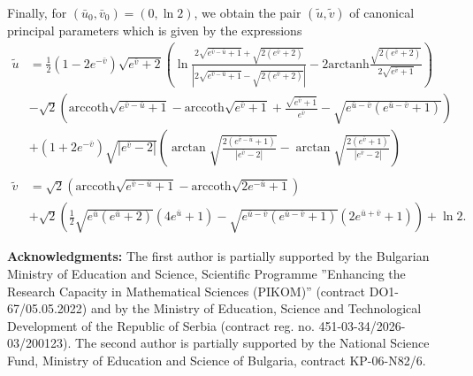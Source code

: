 \documentclass[12pt]{amsart}
\theoremstyle{definition}
\theoremstyle{remark}
\numberwithin{equation}{section}
\begin{document}
Finally, 
 for $(\bar u_0,\bar v_0)=(0, \ln 2)$, %
 we obtain the pair $(\tilde{u}, \tilde{v})$ of canonical principal parameters which is given by the expressions
\begin{equation*}
	\begin{split}
		\tilde{u} & = \frac{1}{2} (1-2e^{-\bar{v}})\sqrt{e^{\bar{v}}+2} \left( \ln \frac{ 2 \sqrt{e^{\bar{v} - \bar{u}}+1} + \sqrt{2(e^{\bar{v}}+2)} }{ | 2 \sqrt{e^{\bar{v} - \bar{u}}+1} - \sqrt{2(e^{\bar{v}}+2)} | } -2 \mathrm{arctanh}\frac{\sqrt{2(e^{\bar{v}}+2)} }{2\sqrt{e^{\bar{v}}+1}} \right) 
		\\ & - \sqrt{2} \left(  \mathrm{arccoth}\sqrt{e^{\bar{v} - \bar{u}}+1} -\mathrm{arccoth}\sqrt{e^{\bar{v} }+1}  + \frac{\sqrt{e^{\bar{v} }+1}}{e^{\bar{v} }} - \sqrt{ e^{\bar{u} - \bar{v}} (e^{\bar{u} - \bar{v}}+1) }  \right) 
		\\ & +  (1+2e^{-\bar{v}})\sqrt{|e^{\bar{v}}-2|} \left( \arctan\sqrt{ \frac{2(e^{\bar{v} - \bar{u}}+1) }{|e^{\bar{v}}-2| } } - \arctan\sqrt{ \frac{2(e^{\bar{v} }+1) }{|e^{\bar{v}}-2| } } \right) 
		\\	\\
		\tilde{v} & = \sqrt{2} \left( \mathrm{arccoth}\sqrt{e^{\bar{v} - \bar{u}}+1} -\mathrm{arccoth}\sqrt{2e^{-\bar{u} }+1}  \right) \\ & + \sqrt{2} \left( \frac{1}{2} \sqrt{e^{\bar{u}} (e^{\bar{u}}+2)  } (4e^{\bar{u}} + 1) - \sqrt{e^{\bar{u}-\bar{v}} (e^{\bar{u}-\bar{v}}+1)  } (2e^{\bar{u}+\bar{v}} + 1) \right) + \ln 2. 
\end{split}\end{equation*}








\vskip 6mm 
\textbf{Acknowledgments:}
The first author is partially supported by the Bulgarian Ministry of Education and  Science, Scientific Programme ''Enhancing the Research Capacity in Mathematical Sciences (PIKOM)''  (contract DO1-67/05.05.2022) and by the Ministry of Education, Science and Technological Development of the Republic of Serbia (contract reg. no. 451-03-34/2026-03/200123).
The second author is partially supported by the National Science Fund, Ministry of Education and Science of Bulgaria, contract KP-06-N82/6. 

\vskip 6mm
\end{document}
